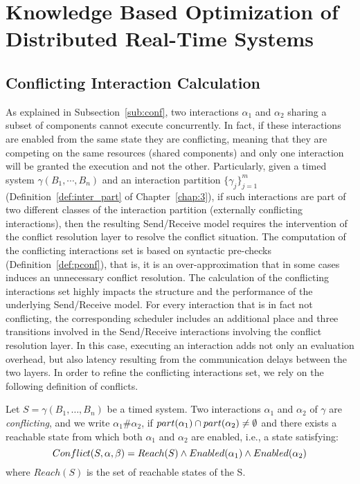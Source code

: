 \chapter{Knowledge Based Optimization of Distributed Real-Time Systems}\label{chap:4}
\minitoc

\section{Conflicting Interaction Calculation}

As explained in Subsection~\ref{sub:conf}, two interactions $\alpha_1$ and $\alpha_2$ 
sharing a subset of components cannot execute concurrently.
In fact, if these interactions are enabled from the same state they are conflicting, meaning
that they are competing on the same resources (shared components) and only one interaction will
be granted the execution and not the other.
Particularly, given a timed system $\gamma(B_1,\cdots,B_n)$ and an interaction partition
$\{\gamma_j\}_{j=1}^m$ (Definition~\ref{def:inter_part} of Chapter~\ref{chap:3}), 
if such interactions are part of two different classes of the interaction
partition (externally conflicting interactions), then the resulting Send/Receive model requires 
the intervention of the conflict resolution layer to resolve the conflict situation. 
The computation of the conflicting interactions set is based on syntactic pre-checks
(Definition~\ref{def:pconf}), that is, it is an over-approximation that in some cases  
induces an unnecessary conflict resolution.  
The calculation of the conflicting interactions set highly impacts the structure and the 
performance of the underlying Send/Receive model. For every interaction that is in fact
not conflicting, the corresponding scheduler includes an additional place and three transitions
involved in the Send/Receive interactions involving the conflict resolution layer.
In this case, executing an interaction adds not only an evaluation overhead, but also latency 
resulting from the communication delays between the two layers.
In order to refine the conflicting interactions set, we rely on the following definition
of conflicts.
\begin{definition}
\label{def:conf}
Let $S = \gamma(B_1,\dotsc,B_n)$ be a timed system. Two interactions 
$\alpha_1$ and $\alpha_2$ of $\gamma$ are \emph{conflicting}, and we write $\alpha_1\#\alpha_2$, 
  if $part(\alpha_1) \cap part(\alpha_2) \neq \emptyset$ and there exists a reachable state from 
which both $\alpha_1$ and $\alpha_2$ are enabled, i.e., a state satisfying:
\begin{equation}\label{eq:conf1}
  Conflict(S,\alpha,\beta)=Reach(S) \wedge Enabled(\alpha_1) \wedge Enabled(\alpha_2)
\end{equation}
  where $Reach(S)$ is the set of reachable states of the S.
\end{definition}

